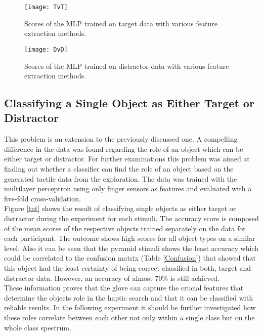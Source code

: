 
\begin{figure}[H]
		\centering
		\texttt{[image: TvT]}
		\caption{Scores of the MLP trained on target data with various feature extraction methods.}
		\label{tvt}
\end{figure}
\begin{figure}[H]
		\centering
		\texttt{[image: DvD]}
		\caption{Scores of the MLP trained on distractor data with various feature extraction methods.}
		\label{dvd}
\end{figure}


\subsection{Classifying a Single Object as Either Target or Distractor}
This problem is an extension to the previously discussed one. A compelling difference in the data was found regarding the role of an object which can be either target or distractor. For further examinations this problem was aimed at finding out whether a classifier can find the role of an object based on the generated tactile data from the exploration. The data was trained with the multilayer perceptron using only finger sensors as features and evaluated with a five-fold cross-validation. \\
Figure \ref{tnt} shows the result of classifying single objects as either target or distractor during the experiment for each stimuli. The accuracy score is composed of the mean scores of the respective objects trained separately on the data for each participant. The outcome shows high scores for all object types on a similar level. Also it can be seen that the pyramid stimuli shows the least accuracy which could be correlated to the confusion matrix (Table \ref{Confusion}) that showed that this object had the least certainty of being correct classified in both, target and distractor data. However, an accuracy of almost 70\% is still achieved. \\
These information proves that the glove can capture the crucial features that determine the objects role in the haptic search and that it can be classified with reliable results. In the following experiment it should be further investigated how these roles correlate between each other not only within a single class but on the whole class spectrum.  
 
